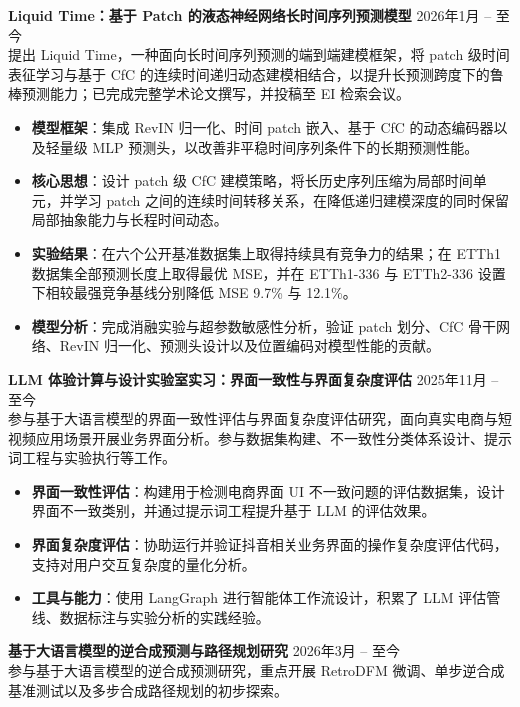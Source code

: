 \documentclass[11pt]{article}
\newlength{\interProjectSpacing}
\newcommand{\projectsep}{\vspace{\interProjectSpacing}}
\newlength{\intraProjectTitleSep}
\newcommand{\titlebreak}{\\[\intraProjectTitleSep]}
\newlength{\intraProjectListTopSep}
\begin{document}
\projectsep

\textbf{Liquid Time：基于 Patch 的液态神经网络长时间序列预测模型} \hfill 2026年1月 -- 至今 \titlebreak
提出 Liquid Time，一种面向长时间序列预测的端到端建模框架，将 patch 级时间表征学习与基于 CfC 的连续时间递归动态建模相结合，以提升长预测跨度下的鲁棒预测能力；已完成完整学术论文撰写，并投稿至 EI 检索会议。

\begin{itemize}
    \item \textbf{模型框架}：集成 RevIN 归一化、时间 patch 嵌入、基于 CfC 的动态编码器以及轻量级 MLP 预测头，以改善非平稳时间序列条件下的长期预测性能。
    \item \textbf{核心思想}：设计 patch 级 CfC 建模策略，将长历史序列压缩为局部时间单元，并学习 patch 之间的连续时间转移关系，在降低递归建模深度的同时保留局部抽象能力与长程时间动态。
    \item \textbf{实验结果}：在六个公开基准数据集上取得持续具有竞争力的结果；在 ETTh1 数据集全部预测长度上取得最优 MSE，并在 ETTh1-336 与 ETTh2-336 设置下相较最强竞争基线分别降低 MSE 9.7\% 与 12.1\%。
    \item \textbf{模型分析}：完成消融实验与超参数敏感性分析，验证 patch 划分、CfC 骨干网络、RevIN 归一化、预测头设计以及位置编码对模型性能的贡献。
\end{itemize}

\projectsep

\textbf{LLM 体验计算与设计实验室实习：界面一致性与界面复杂度评估} \hfill 2025年11月 -- 至今 \titlebreak
参与基于大语言模型的界面一致性评估与界面复杂度评估研究，面向真实电商与短视频应用场景开展业务界面分析。参与数据集构建、不一致性分类体系设计、提示词工程与实验执行等工作。

\begin{itemize}[nosep, topsep=\intraProjectListTopSep]
    \item \textbf{界面一致性评估}：构建用于检测电商界面 UI 不一致问题的评估数据集，设计界面不一致类别，并通过提示词工程提升基于 LLM 的评估效果。
    \item \textbf{界面复杂度评估}：协助运行并验证抖音相关业务界面的操作复杂度评估代码，支持对用户交互复杂度的量化分析。
    \item \textbf{工具与能力}：使用 LangGraph 进行智能体工作流设计，积累了 LLM 评估管线、数据标注与实验分析的实践经验。
\end{itemize}

\projectsep

\textbf{基于大语言模型的逆合成预测与路径规划研究} \hfill 2026年3月 -- 至今 \titlebreak
参与基于大语言模型的逆合成预测研究，重点开展 RetroDFM 微调、单步逆合成基准测试以及多步合成路径规划的初步探索。
\end{document}
